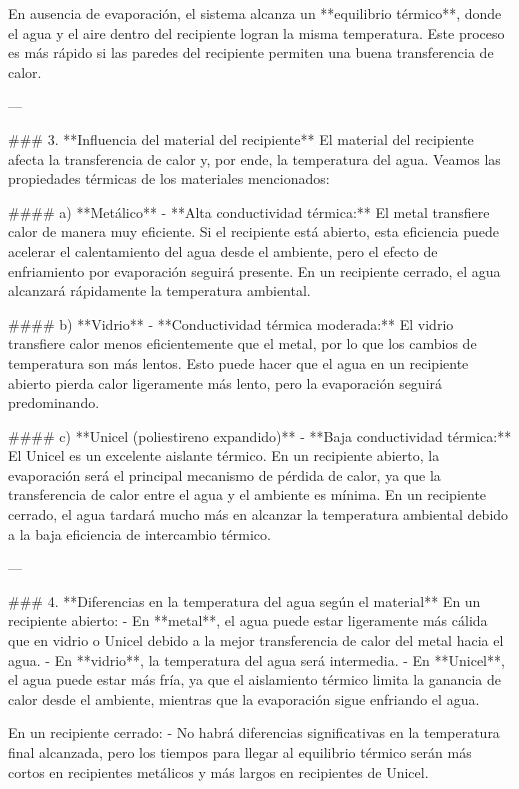 \documentclass[article,12pt]{elsarticle}
\begin{document}
En ausencia de evaporación, el sistema alcanza un **equilibrio térmico**, donde el agua y el aire dentro del recipiente logran la misma temperatura. Este proceso es más rápido si las paredes del recipiente permiten una buena transferencia de calor.

---

### 3. **Influencia del material del recipiente**
El material del recipiente afecta la transferencia de calor y, por ende, la temperatura del agua. Veamos las propiedades térmicas de los materiales mencionados:

#### a) **Metálico**
- **Alta conductividad térmica:** El metal transfiere calor de manera muy eficiente. Si el recipiente está abierto, esta eficiencia puede acelerar el calentamiento del agua desde el ambiente, pero el efecto de enfriamiento por evaporación seguirá presente. En un recipiente cerrado, el agua alcanzará rápidamente la temperatura ambiental.

#### b) **Vidrio**
- **Conductividad térmica moderada:** El vidrio transfiere calor menos eficientemente que el metal, por lo que los cambios de temperatura son más lentos. Esto puede hacer que el agua en un recipiente abierto pierda calor ligeramente más lento, pero la evaporación seguirá predominando.

#### c) **Unicel (poliestireno expandido)**
- **Baja conductividad térmica:** El Unicel es un excelente aislante térmico. En un recipiente abierto, la evaporación será el principal mecanismo de pérdida de calor, ya que la transferencia de calor entre el agua y el ambiente es mínima. En un recipiente cerrado, el agua tardará mucho más en alcanzar la temperatura ambiental debido a la baja eficiencia de intercambio térmico.

---

### 4. **Diferencias en la temperatura del agua según el material**
En un recipiente abierto:
- En **metal**, el agua puede estar ligeramente más cálida que en vidrio o Unicel debido a la mejor transferencia de calor del metal hacia el agua.
- En **vidrio**, la temperatura del agua será intermedia.
- En **Unicel**, el agua puede estar más fría, ya que el aislamiento térmico limita la ganancia de calor desde el ambiente, mientras que la evaporación sigue enfriando el agua.

En un recipiente cerrado:
- No habrá diferencias significativas en la temperatura final alcanzada, pero los tiempos para llegar al equilibrio térmico serán más cortos en recipientes metálicos y más largos en recipientes de Unicel.
\end{document}
